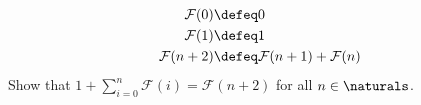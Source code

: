 \begin{enumerate}
\begin{align*}
        \mathcal{F}(0) &\defeq 0 \\
        \mathcal{F}(1) &\defeq 1 \\
        \mathcal{F}(n + 2) &\defeq \mathcal{F}(n + 1) + \mathcal{F}(n)
    \end{align*}
    Show that $1 + \displaystyle\sum_{i = 0}^{n}\mathcal{F}(i) = \mathcal{F}(n + 2)$ for all $n \in \naturals$.

\end{enumerate}


